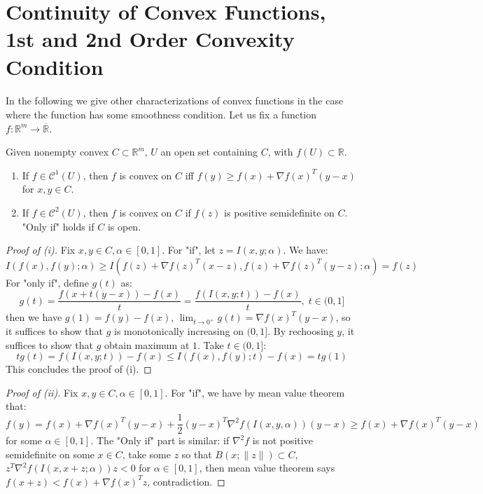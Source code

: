 \section{Continuity of Convex Functions, 1st and 2nd Order Convexity Condition}
\label{sect:022}

\paragraph{}In the following we give other characterizations of convex functions in the case where the function has some smoothness condition. Let us fix a function $f:\mathbb{R}^m\to \overline{\mathbb{R}}$.

\begin{prop}
	\label{prop:022-ordered-conditions-convexity}
	Given nonempty convex $C\subset \mathbb{R}^m$, $U$ an open set containing $C$, with $f(U)\subset \mathbb{R}$.
	\begin{enumerate}[label=(\roman*)]
		\item If $f\in\mathscr{C}^1(U)$, then $f$ is convex on $C$ iff $f(y)\geq f(x)+\nabla f(x)^T(y-x)$ for $x,y\in C$.
		\item If $f\in\mathscr{C}^2(U)$, then $f$ is convex on $C$ if $f(z)$ is positive semidefinite on $C$. "Only if" holds if $C$ is open.
	\end{enumerate}
\end{prop}
\begin{proof}[Proof of (i)]
	Fix $x,y\in C,\alpha \in [0, 1]$. For "if", let $z=I(x,y; \alpha )$. We have:
	\[
		I(f(x),f(y);\alpha )  \geq I(f(z)+\nabla f(z)^T(x-z),f(z)+\nabla f(z)^T(y-z);\alpha ) = f(z)
	\]
	For "only if", define $g(t)$ as:
	\[
		g(t)=\frac{f(x+t(y-x))-f(x)}{t}=\frac{f(I(x,y;t))-f(x)}{t},\;t\in(0, 1]
	\]
	then we have $g(1)=f(y)-f(x)$, $\lim_{t\to0^+}g(t)=\nabla f(x)^T(y-x)$, so it suffices to show that $g$ is monotonically increasing on $(0, 1]$. By rechoosing $y$, it suffices to show that $g$ obtain maximum at $1$. Take $t\in(0,1]$:
	\[
		tg(t)=f(I(x,y;t))-f(x)\leq I(f(x),f(y);t)-f(x)=tg(1)
	\]
	This concludes the proof of (i).
\end{proof}
\begin{proof}[Proof of (ii)]
	Fix $x,y\in C,\alpha \in [0, 1]$. For "if", we have by mean value theorem that:
	\[
		f(y)=f(x)+\nabla f(x)^T(y-x)+\frac{1}{2}(y-x)^T\nabla^2f(I(x,y,\alpha ))(y-x)\geq f(x)+\nabla f(x)^T(y-x)
	\]
	for some $\alpha \in[0,1]$. The "Only if" part is similar: if $\nabla^2 f$ is not positive semidefinite on some $x\in C$, take some $z$ so that $B(x;\|z\|)\subset C$, $z^T\nabla^2f(I(x, x+z;\alpha))z<0$ for $\alpha\in[0,1]$, then mean value theorem says $f(x+z)<f(x)+\nabla f(x)^Tz$, contradiction.
\end{proof}

